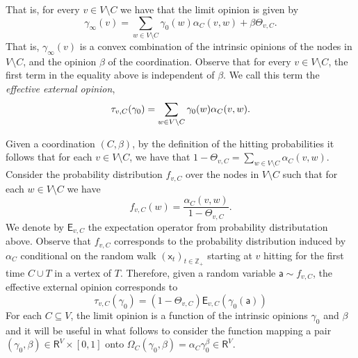 \documentclass[letterpaper,11pt]{article}
\newcommand{\PP}{\mathbb{P}}
\newcommand{\RR}{\mathsf{R}}
\newcommand{\ZZ}{\mathbb{Z}}
\newcommand{\EE}{\mathsf{E}}
\newcommand{\vvcom}[1]{\todo[color=red!25!white]{Victor: #1}}
\begin{document}
\noindent That is, for every $v\in V\setminus C$ we have that the limit opinion is given by
\begin{equation*}
\gamma_{\infty}(v)=\sum_{w\in V\setminus C}\gamma_0(w)\alpha_C(v,w)+\beta\Theta_{v,C}.
\end{equation*}
That is, $\gamma_{\infty}(v)$ is a convex combination of the intrinsic opinions of the nodes in $V\setminus C$, and the opinion $\beta$ of the coordination. 
Observe that for every $v\in V\setminus C$, the first term in the equality above is independent of $\beta$.
We call this term the {\it effective external opinion},
\begin{equation}
\tau_{v,C}(\gamma_0)=\sum_{w\in V\setminus C}\gamma_0(w)\alpha_C(v,w).\\
\end{equation}

Given a coordination $(C,\beta)$, by the definition of the hitting probabilities it follows that for each $v\in V\setminus C$, we have that $1-\Theta_{v,C}=\sum_{w\in V\setminus C}\alpha_C(v,w)$.
Consider the probability distribution $f_{v,C}$ over the nodes in $V\setminus C$ such that for each $w\in V\setminus C$ we have 
\begin{equation*}
f_{v,C}(w)=\frac{\alpha_C(v,w)}{1-\Theta_{v,C}}.
\end{equation*}
We denote by $\EE_{v,C}$ the expectation operator from probability distributation above.
Observe that $f_{v,C}$ corresponds to the probability distribution induced by $\alpha_C$ conditional on the random walk $(\mathsf{x}_t)_{t\in \ZZ_+}$ starting at $v$ hitting for the first time $C\cup T$ in a vertex of $T$.
Therefore, given a random variable $\mathsf{a}\sim f_{v,C}$, the effective external opinion corresponds to 
\begin{equation*}
\tau_{v,C}(\gamma_0)=(1-\Theta_{v,C})\EE_{v,C}(\gamma_0(\mathsf{a}))
\end{equation*}
For each $C\subseteq V$, the limit opinion is a function of the intrinsic opinions $\gamma_0$ and $\beta$ and it will be useful in what follows to consider the function mapping a pair $(\gamma_0,\beta)\in \RR^V\times [0,1]$ onto $\Omega_C(\gamma_0,\beta)=\alpha_C \gamma_0^{\beta}\in \RR^V$.\\
\end{document}
